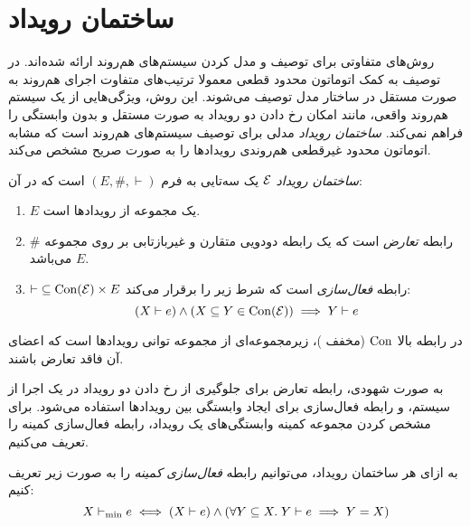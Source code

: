 \section{ساختمان رویداد}\label{sec:event-structure}

روش‌های متفاوتی برای توصیف و مدل کردن
سیستم‌های هم‌روند ارائه شده‌اند.
در توصیف به کمک اتوماتون محدود قطعی
معمولا ترتیب‌های متفاوت اجرای هم‌روند به صورت مستقل
در ساختار مدل توصیف می‌شوند. این روش، ویژگی‌هایی از
یک سیستم هم‌روند واقعی، مانند امکان رخ دادن دو رویداد
به صورت مستقل و بدون وابستگی را فراهم نمی‌کند.
\textit{ساختمان رویداد}
مدلی برای توصیف سیستم‌های هم‌روند است که مشابه
اتوماتون محدود غیرقطعی
هم‌روندی رویدادها را به صورت صریح مشخص می‌کند.

\begin{definition}\label{def:event-structure}
  \textit{ساختمان رویداد}
  $\mathcal{E}$
  یک سه‌تایی به فرم
  $(E, \#, \vdash)$
  است که در آن:
  \begin{enumerate}[label=(\alph*)]
    \item $E$
    یک مجموعه از رویداد‌ها است.
    \item $\#$
    رابطه
    \textit{تعارض}
    است که یک رابطه دودویی متقارن و غیربازتابی بر روی مجموعه
    $E$
    می‌باشد.

    \item $\vdash\;\subseteq \operatorname{Con}(\mathcal{E}) \times E$
    رابطه
    \textit{فعال‌سازی}
    است که شرط زیر را برقرار می‌کند:
    \begin{equation*}
        (X \vdash e) \wedge (X \subseteq Y \in \operatorname{Con}(\mathcal{E}))
        \implies Y \vdash e
    \end{equation*}
  \end{enumerate}
\end{definition}

در رابطه بالا
$\operatorname{Con}$
(مخفف
)،
زیرمجموعه‌ای از مجموعه توانی رویدادها است که اعضای آن فاقد تعارض باشند.

به صورت شهودی، رابطه تعارض برای جلوگیری از رخ دادن
دو رویداد در یک اجرا از سیستم،
و رابطه فعال‌سازی برای ایجاد وابستگی بین رویدادها استفاده می‌شود.
برای مشخص کردن مجموعه کمینه وابستگی‌های یک رویداد،
رابطه فعال‌سازی کمینه را تعریف می‌کنیم.

\begin{definition}\label{def:min-enabling}
  به ازای هر ساختمان رویداد، می‌توانیم رابطه
  \textit{فعال‌سازی کمینه}
  را به صورت زیر تعریف کنیم:
  \begin{equation*}
    X \vdash_{\min} e \iff
    (X \vdash e) \wedge
    (\forall Y \subseteq X.\;Y \vdash e \implies Y=X)
  \end{equation*}
\end{definition}


